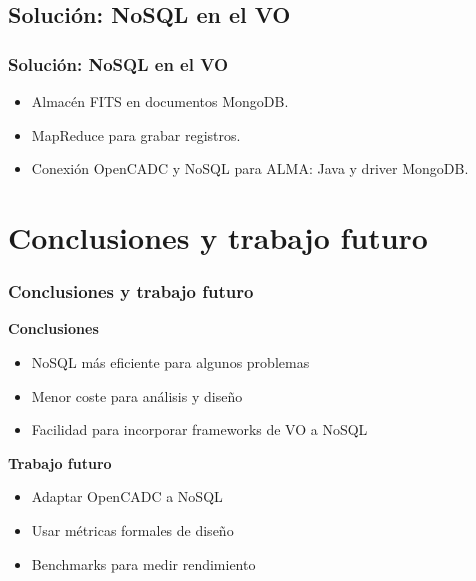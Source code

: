 \documentclass[serif,12pt]{beamer}
\begin{document}
\subsection{Solución: NoSQL en el VO}
\begin{frame}
\frametitle{Solución: NoSQL en el VO}

\begin{itemize}
\item Almacén FITS en documentos MongoDB.
\item MapReduce para grabar registros.
\item Conexión OpenCADC y NoSQL para ALMA: Java y driver MongoDB.
\end{itemize}


\end{frame}


\section{Conclusiones y trabajo futuro}
\begin{frame}
\frametitle{Conclusiones y trabajo futuro}

\begin{multicols}{2}

\textbf{Conclusiones}
\begin{itemize}
\item NoSQL más eficiente para algunos problemas
\item Menor coste para análisis y diseño
\item Facilidad para incorporar frameworks de VO a NoSQL
\end{itemize}

\textbf{Trabajo futuro}
\begin{itemize}
\item Adaptar OpenCADC a NoSQL
\item Usar métricas formales de diseño
\item Benchmarks para medir rendimiento
\end{itemize}

\end{multicols}

\end{frame}
\end{document}
